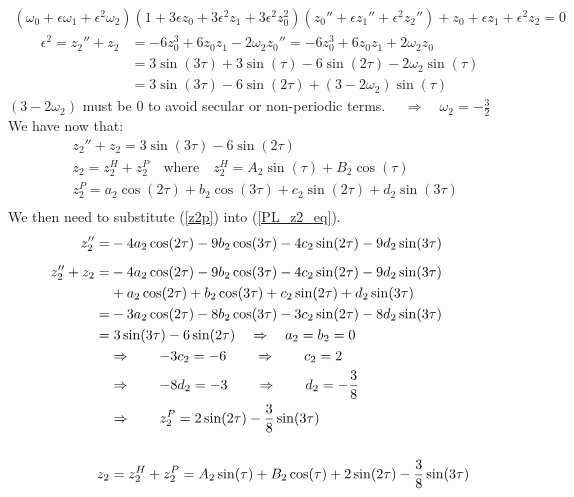 \documentclass[a4paper,10pt]{article}
\begin{document}
\begin{align}
(\omega_0 + \epsilon \omega_1 + \epsilon^2 \omega_2)(1+3\epsilon z_0 + 3\epsilon^2 z_1 + 3 \epsilon^2 z_0^2)(z_0'' + \epsilon z_1'' + \epsilon^2 z_2'')+ z_0 + \epsilon z_1 + \epsilon^2 z_2 =0 \nonumber
\end{align}
\begin{align}
\epsilon^2 = z_2'' + z_2 &= -6 z_0^3 + 6 z_0 z_1 -2 \omega_2 z_0'' = -6 z_0^3 + 6 z_0 z_1 + 2 \omega_2 z_0 \nonumber\\
&= 3 \sin(3 \tau) + 3 \sin(\tau) -6 \sin(2 \tau) - 2 \omega_2 \sin(\tau)\nonumber\\
&= 3 \sin(3 \tau) - 6 \sin(2 \tau) + (3 - 2\omega_2) \sin(\tau) \nonumber
\end{align}
$(3 - 2\omega_2)$ must be 0 to avoid secular or non-periodic terms. $\quad \Rightarrow \quad \omega_2 = -\frac{3}{2}$\\[1em]
We have now that: 
\begin{align}
&z_2'' + z_2 = 3 \sin(3 \tau) -6 \sin(2 \tau) \label{PL_z2_eq}\\
&z_2 = z_2^H + z_2^P \quad \text{where} \quad z_2^H = A_2 \sin(\tau) + B_2 \cos(\tau)\nonumber \\
&z_2^P = a_2 \cos(2 \tau) + b_2 \cos(3 \tau) + c_2 \sin(2 \tau) + d_2 \sin(3 \tau) \label{z2p}\\ \nonumber
\end{align}
We then need to substitute (\ref{z2p}) into (\ref{PL_z2_eq}).
\begin{align}
z_2'' = &-4 a_2 \cos(2 \tau) - 9 b_2 \cos(3 \tau) - 4 c_2 \sin(2 \tau) - 9 d_2 \sin(3 \tau) \nonumber \\[2mm]
z_2'' + z_2 = &-4 a_2 \cos(2 \tau) - 9 b_2 \cos(3 \tau) - 4 c_2 \sin(2 \tau) - 9 d_2 \sin(3 \tau) \nonumber \\
&+ a_2 \cos(2 \tau) + b_2 \cos(3 \tau) + c_2 \sin(2 \tau) + d_2 \sin(3 \tau)\nonumber\\
=&-3 a_2 \cos(2 \tau) - 8 b_2 \cos(3 \tau) - 3 c_2 \sin(2 \tau) - 8 d_2 \sin(3 \tau) \nonumber \\
= & \hspace{1mm}3 \sin(3 \tau) -6 \sin(2 \tau) \quad \Rightarrow \quad a_2 = b_2 = 0 \nonumber \\
&\Rightarrow \qquad -3 c_2 = -6 \qquad \Rightarrow \qquad c_2 = 2 \nonumber \\
&\Rightarrow \qquad -8 d_2 = -3 \qquad \Rightarrow \qquad d_2 = -\frac{3}{8} \nonumber \\
&\Rightarrow \qquad z_2^P = 2 \sin(2 \tau) - \frac{3}{8} \sin(3 \tau) \nonumber \\ \nonumber \\
z_2 &= z_2^H + z_2^P = A_2 \sin(\tau) + B_2 \cos(\tau) + 2 \sin(2 \tau) - \frac{3}{8} \sin(3 \tau)\\ \nonumber
\end{align}
\end{document}
